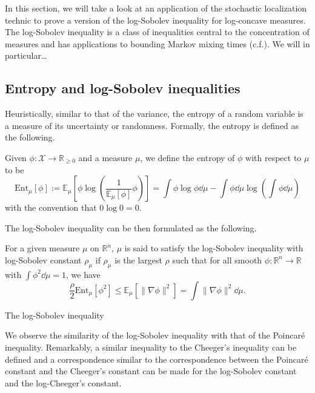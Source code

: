 In this section, we will take a look at an application of the stochastic localization technic 
to prove a version of the log-Sobolev inequality for log-concave measures. The log-Sobolev inequality 
is a class of inequalities central to the concentration of measures and has applications to bounding 
Markov mixing times (c.f.). We will in particular\dots

\subsection{Entropy and log-Sobolev inequalities}

Heuristically, similar to that of the variance, the entropy of a random variable is a measure of its 
uncertainty or randomness. Formally, the entropy is defined as the following.

\begin{definition}[Entropy]
  Given \(\phi : \mathcal{X} \to \mathbb{R}_{\ge 0}\) and a measure \(\mu\), we define the entropy of \(\phi\) 
  with respect to \(\mu\) to be 
  \[\text{Ent}_\mu[\phi] := \mathbb{E}_\mu\left[\phi \log\left(\frac{1}{\mathbb{E}_\mu[\phi]} \phi\right)\right]
   = \int \phi \log \phi \dd \mu - \int \phi \dd \mu \log\left(\int \phi \dd \mu\right)\]
  with the convention that \(0\log 0 = 0\).
\end{definition}
The log-Sobolev inequality can be then formulated as the following.
\begin{definition}
  For a given measure \(\mu\) on \(\mathbb{R}^n\), \(\mu\) is said to satisfy the log-Sobolev inequality with log-Sobolev 
  constant \(\rho_\mu\) if \(\rho_\mu\) is the largest \(\rho\) such that for all smooth 
  \(\phi : \mathbb{R}^n \to \mathbb{R}\) with \(\int \phi^2 \dd \mu = 1\), we have 
  \[\frac{\rho}{2} \text{Ent}_\mu[\phi^2] \le \mathbb{E}_\mu[\|\nabla \phi\|^2] = \int \|\nabla \phi\|^2 \dd \mu.\]
\end{definition}

The log-Sobolev inequality


We observe the similarity of the log-Sobolev inequality with that of the Poincaré inequality. Remarkably, 
a similar inequality to the Cheeger's inequality can be defined and a correspondence similar to the correspondence 
between the Poincaré constant and the Cheeger's constant can be made for the log-Sobolev constant and the 
log-Cheeger's constant.

